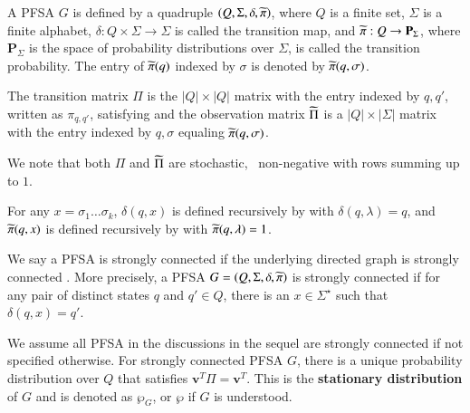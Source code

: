 \begin{defn}
\label{defn:PFSA}
A PFSA $G$ is defined by a quadruple $\left( Q, \Sigma, \delta, \widetilde{\pi} \right)$, where $Q$ is a finite set, $\Sigma$ is a finite alphabet, $\delta: Q\times\Sigma \rightarrow \Sigma$ is called the transition map, and $\widetilde{\pi}: Q \rightarrow \mathbf{P}_\Sigma$, where $\mathbf{P}_\Sigma$ is the space of probability distributions over $\Sigma$, is called the transition probability. The entry of $\widetilde{\pi}(q)$ indexed by $\sigma$ is denoted by $\widetilde{\pi}(q,\sigma)$. 
\end{defn}
\begin{defn}
The transition matrix $\Pi$ is the $|Q|\times|Q|$ matrix with the entry indexed by $q, q'$, written as $\pi_{q, q'}$, satisfying
and the observation matrix $\widetilde{\Pi}$ is a $|Q|\times|\Sigma|$ matrix with the entry indexed by $q, \sigma$ equaling $\widetilde{\pi}(q, \sigma)$.
\end{defn}
We note that both $\Pi$ and $\widetilde{\Pi}$ are stochastic, \ie~non-negative with rows summing up to $1$. 
%
\begin{defn}
For any $x = \sigma_1\dots\sigma_k$, $\delta(q, x)$ is defined recursively by 
with $\delta(q, \lambda) = q$, and $\widetilde{\pi}(q, x)$ is defined recursively by
with $\widetilde{\pi}(q, \lambda) = 1$. 
\end{defn}
%
\begin{defn}
\label{defn:StrongConn}
We say a PFSA is strongly connected if the underlying directed graph is strongly connected \cite{bondy2008graph}. More precisely, a PFSA $G = \left( Q, \Sigma, \delta, \widetilde{\pi} \right)$ is strongly connected if for any pair of distinct states $q$ and $q'\in{Q}$, there is an $x\in\Sigma^{\star}$ such that $\delta(q, x) = q'$.
\end{defn}
We assume all PFSA in the discussions in the sequel are strongly connected if not specified otherwise. For strongly connected PFSA $G$, there is a unique probability distribution over $Q$ that satisfies $\mathbf{v}^{T}\Pi = \mathbf{v}^{T}$. This is  the \textbf{stationary distribution} \cite{vidyasagar2014hidden,kai1967markov_StDis} of $G$ and is denoted as $\wp_G$, or $\wp$ if $G$ is understood. 

